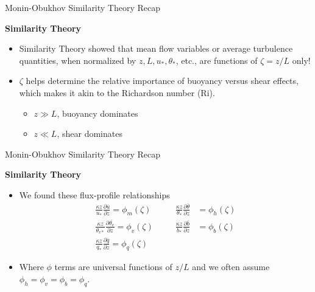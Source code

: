 \begin{frame}{Monin-Obukhov Similarity Theory Recap}

\textbf{Similarity Theory}
\begin{itemize}
	\item Similarity Theory showed that mean flow variables or average turbulence quantities, when normalized by $z, L, u_*, \theta_*$, etc., are functions of $\zeta = z/L$ only!
	\item $\zeta$ helps determine the relative importance of buoyancy versus shear effects, which makes it akin to the Richardson number (Ri).
	\begin{itemize}
		\item $z \gg L$, buoyancy dominates
		\item $z \ll L$, shear dominates
	\end{itemize}
\end{itemize}
\end{frame}
\begin{frame}{Monin-Obukhov Similarity Theory Recap}

\textbf{Similarity Theory}
\begin{itemize}
	\item We found these flux-profile relationships
	\begin{align*}
		\frac{\kappa z}{u_*} \frac{\partial \overline{u}}{\partial z} = \phi_m \left(\zeta \right) & \quad & \frac{\kappa z}{\theta_*} \frac{\partial \overline{\theta}}{\partial z} &= \phi_h \left(\zeta \right)\\
		\frac{\kappa z}{\theta_{v*}} \frac{\partial \overline{\theta_v}}{\partial z} = \phi_v \left(\zeta \right) & \quad & \frac{\kappa z}{b_*} \frac{\partial \overline{b}}{\partial z} &= \phi_b \left(\zeta \right)\\
			\frac{\kappa z}{q_{*}} \frac{\partial \overline{q}}{\partial z} = \phi_q \left(\zeta \right)
		\end{align*}
		\item Where $\phi$ terms are universal functions of $z/L$ and we often assume $\phi_h = \phi_v = \phi_b = \phi_q$.
\end{itemize}
\end{frame}
